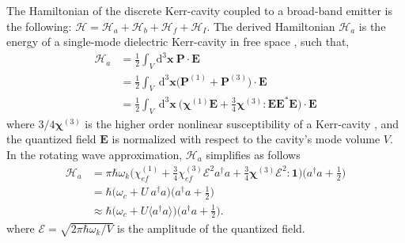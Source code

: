 \documentclass[12pt]{article}
\begin{document}
The Hamiltonian of the discrete Kerr-cavity coupled to a broad-band emitter is
the following: $\mathcal{H} = \mathcal{H}_{a} + \mathcal{H}_{b} + 
\mathcal{H}_{f} + \mathcal{H}_{I}$. The derived Hamiltonian $\mathcal{H}_{a}$ 
is the energy of a single-mode dielectric Kerr-cavity in free space 
\cite{jackson1999classical, hillery1984quantization}, such that,
\begin{equation}
\begin{split}
\mathcal{H}_{a} &= \frac{1}{2} 
    \int_{V} \mathrm{d}^{3}\mathbf{x} \: \mathbf{P} \cdot \mathbf{E}
\\
&= \frac{1}{2} 
    \int_{V} \: \mathrm{d}^{3}\mathbf{x}
    \Big( \mathbf{P}^{(1)} + \mathbf{P}^{(3)} \Big)
    \cdot \mathbf{E}
\\
&= \frac{1}{2} 
    \int_{V} \: \mathrm{d}^{3}\mathbf{x} \: 
    \Big( \bm\chi^{(1)} \mathbf{E}  + 
    \frac{3}{4}\bm\chi^{(3)}:\mathbf{E}\mathbf{E}^{*} \mathbf{E} \Big)
    \cdot \mathbf{E}
\end{split}
\end{equation}
where $3/4\mathbf{\chi}^{(3)}$ is the higher order nonlinear susceptibility of
a Kerr-cavity \cite{butcher1990elements}, and the quantized field $\mathbf{E}$
is normalized with respect to the cavity's mode volume $V$. In the rotating
wave approximation, $\mathcal{H}_{a}$ simplifies as follows
\begin{equation}
\begin{split}
\mathcal{H}_{a} &= \pi\hbar\omega_k \Big(
    \chi^{(1)}_{ef} +
    \frac{3}{4} \chi^{(3)}_{ef} \mathcal{E}^2
    a^{\dagger}a + \frac{3}{4}\bm\chi^{(3)} \mathcal{E}^2 : \mathbf{1} \Big)
    \Big( a^{\dagger}a + \frac{1}{2} \Big)
\\
&= \hbar \Big( \omega_c + U\:a^{\dagger}a \Big)
    \Big( a^{\dagger}a + \frac{1}{2} \Big)
\\  
&\approx \hbar \Big( \omega_c + U \langle a^{\dagger}a \rangle \Big)
    \Big( a^{\dagger}a + \frac{1}{2} \Big).
\end{split}
\end{equation}
where $\mathcal{E} = \sqrt{2\pi \hbar \omega_k / V }$ is the amplitude of the
quantized field.
\end{document}
